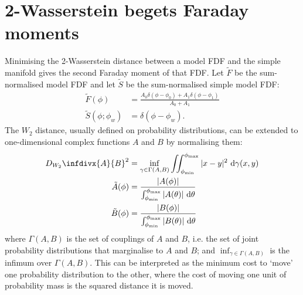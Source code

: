   \section{2-Wasserstein begets Faraday moments}
  \label{sec:faraday-w2-to-faraday-moments}
    Minimising the 2-Wasserstein distance between a model FDF and the simple manifold gives the second Faraday moment of that FDF. Let $\tilde F$ be the sum-normalised model FDF and let $\tilde S$ be the sum-normalised simple model FDF:
    \begin{align}
      \tilde F(\phi) &= \frac{A_0 \delta(\phi - \phi_0) + A_1 \delta(\phi - \phi_1)}{A_0 + A_1}\\
      \tilde S(\phi; \phi_w) &= \delta(\phi - \phi_w).
    \end{align}
    The $W_2$ distance, usually defined on probability distributions, can be extended to one-dimensional complex functions $A$ and $B$ by normalising them:
      \begin{align}
        \label{eq:faraday-w2}
        D_{W_2}\infdivx{A}{B}^2 &= \inf_{\gamma \in \Gamma(A, B)} \iint_{\phi_{\min}}^{\phi_{\max}} |x - y|^2\ \mathrm{d}\gamma(x, y) \\
        \label{eq:faraday-normalised}
        \tilde A(\phi) &= \frac{|A(\phi)|}{\int_{\phi_{\min}}^{\phi_{\max}} |A(\theta)|\ \mathrm{d}\theta}\\
        \tilde B(\phi) &= \frac{|B(\phi)|}{\int_{\phi_{\min}}^{\phi_{\max}} |B(\theta)|\ \mathrm{d}\theta}
      \end{align}
      where $\Gamma(A, B)$ is the set of couplings of $A$ and $B$, i.e. the set of joint probability distributions that marginalise to $A$ and $B$; and $\inf_{\gamma \in \Gamma(A, B)}$ is the infimum over $\Gamma(A, B)$. This can be interpreted as the minimum cost to `move' one probability distribution to the other, where the cost of moving one unit of probability mass is the squared distance it is moved.

